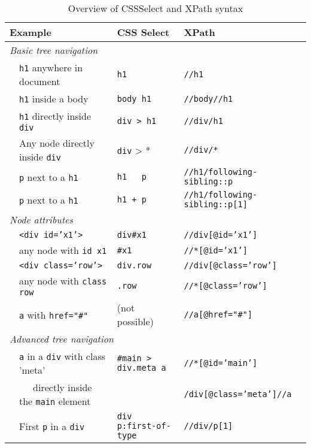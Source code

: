 \begin{table}
  \caption{\label{tab:cssselect}Overview of CSSSelect and XPath syntax}{
  \begin{tabularx}{\textwidth}{llll}
\toprule
\multicolumn{2}{l}{Example}      & CSS Select   & XPath    \\
\midrule
\multicolumn{3}{l}{\textit{Basic tree navigation}} \\
& \texttt{\small{h1}} anywhere in document & \texttt{\small{h1}} & \texttt{\small{//h1}} \\
& \texttt{\small{h1}} inside a body & \texttt{\small{body h1}} & \texttt{\small{//body//h1}} \\
& \texttt{\small{h1}} directly inside \texttt{\small{div}} & \texttt{\small{div > h1}} & \texttt{\small{//div/h1}} \\
& Any node directly inside \texttt{\small{div}} & \texttt{\small{div}} > * & \texttt{\small{//div/*}} \\
& \texttt{\small{p}} next to a \texttt{\small{h1}} & \texttt{\small{h1 ~ p}} & \texttt{\small{//h1/following-sibling::p}} \\
& \texttt{\small{p}} next to a \texttt{\small{h1}} & \texttt{\small{h1 + p}} & \texttt{\small{//h1/following-sibling::p[1]}} \\
\multicolumn{3}{l}{\textit{Node attributes}} \\
& \texttt{\small{<div id='x1'>}} & \texttt{\small{div\#x1}} & \texttt{\small{//div[@id='x1']}} \\
& any node with \texttt{\small{id x1}} & \texttt{\small{\#x1}} & \texttt{\small{//*[@id='x1']}} \\
& \texttt{\small{<div class='row'>}} & \texttt{\small{div.row}} & \texttt{\small{//div[@class='row']}} \\
& any node with \texttt{\small{class row}} & \texttt{\small{.row}} & \texttt{\small{//*[@class='row']}} \\
& \texttt{\small{a}} with \texttt{\small{href="\#"}} & (not possible) & \texttt{\small{//a[@href="\#"]}} \\
\multicolumn{3}{l}{\textit{Advanced tree navigation}} \\
& \texttt{\small{a}} in a \texttt{\small{div}} with class 'meta' & \texttt{\small{\#main > div.meta a}} & \texttt{\small{//*[@id='main']}} \\
& $\;\;\;\;$ directly inside the \texttt{\small{main}} element & &$\;\;\;\;$ \texttt{\small{/div[@class='meta']//a}} \\
& First \texttt{\small{p}} in a \texttt{\small{div}} & \texttt{\small{div p:first-of-type}} & \texttt{\small{//div/p[1]}} \\

\end{tabularx}}
\end{table}
